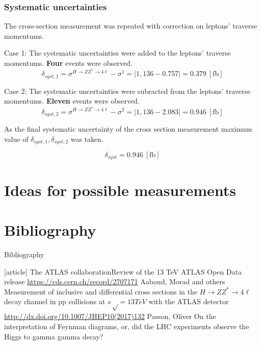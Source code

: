 \documentclass[aspectratio=1610, english]{beamer}
\newcommand{\hzz}{ H\rightarrow ZZ^{*}\rightarrow 4 \ell}
\begin{document}
\begin{frame}
\frametitle{Systematic uncertainties}
The cross-section measurement was repeated with correction on leptons' traverse momentums.\\
\vspace{0.5cm}

Case 1: The systematic uncertainties were added to the leptons' traverse momentums.
\textbf{Four} events were observed.
\begin{equation}
\delta_{syst, 1} = \sigma^{\hzz} - \sigma^1 = | 1,136 - 0.757 | = 0.379 \: [\mathrm{fb}]
\end{equation}

Case 2: The systematic uncertainties were subracted from the leptons' traverse momentums.
\textbf{Eleven} events were observed.
\begin{equation}
\delta_{syst, 2} = \sigma^{\hzz} - \sigma^2 = | 1,136 - 2.083 | = 0.946 \: [\mathrm{fb}]
\end{equation}

As the final systematic uncertainty of the cross section measurement maximum value of $\delta_{syst, 1}, \delta_{syst, 2}$ was taken.

\begin{equation}
\delta_{syst} = 0.946 \: [\mathrm{fb}]
\end{equation}

\end{frame}

\section{Ideas for possible measurements}

\section{Bibliography}
\begin{frame}[allowframebreaks]{Bibliography}
\begin{thebibliography}{9}
		[article]
			{The ATLAS collaboration\newblock Review of the 13 TeV ATLAS Open Data release \newblock \url{https://cds.cern.ch/record/2707171}}
			{Aaboud, Morad and others \newblock Measurement of inclusive and differential cross sections in the $ \hzz $ decay channel in pp collisions at $s√ = 13 TeV$ with the ATLAS detector \newblock \url{http://dx.doi.org/10.1007/JHEP10(2017)132}}
			{Passon, Oliver \newblock On the interpretation of Feynman diagrams, or, did the LHC experiments observe the Higgs to gamma gamma decay?}
\end{thebibliography}
\end{frame}
\end{document}
